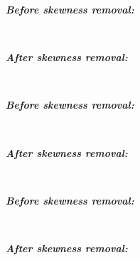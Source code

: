 \documentclass[11pt, a4paper , landscape]{article}
\begin{document}
    \textbf{\emph{Before skewness removal:}}

    
    \begin{center}
    \end{center}
    { \hspace*{\fill} \\}
    
    \textbf{\emph{After skewness removal:}}

    
    \begin{center}
    \end{center}
    { \hspace*{\fill} \\}
    
    \textbf{\emph{Before skewness removal:}}

    
    \begin{center}
    \end{center}
    { \hspace*{\fill} \\}
    
    \textbf{\emph{After skewness removal:}}

    
    \begin{center}
    \end{center}
    { \hspace*{\fill} \\}
    
    \textbf{\emph{Before skewness removal:}}

    
    \begin{center}
    \end{center}
    { \hspace*{\fill} \\}
    
    \textbf{\emph{After skewness removal:}}

    
    \begin{center}
    \end{center}
    { \hspace*{\fill} \\}
    
\end{document}
